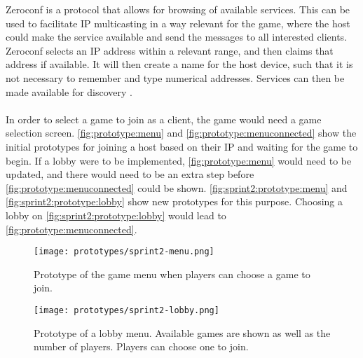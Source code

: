 Zeroconf is a protocol that allows for browsing of available services.
This can be used to facilitate IP multicasting in a way relevant for the game, where the host could make the service available and send the messages to all interested clients.
Zeroconf selects an IP address within a relevant range, and then claims that address if available.
It will then create a name for the host device, such that it is not necessary to remember and type numerical addresses.
Services can then be made available for discovery \cite{zeroconf}.
\\\\
In order to select a game to join as a client, the game would need a game selection screen.
\autoref{fig:prototype:menu} and \autoref{fig:prototype:menuconnected} show the initial prototypes for joining a host based on their IP and waiting for the game to begin.
If a lobby were to be implemented, \autoref{fig:prototype:menu} would need to be updated, and there would need to be an extra step before \autoref{fig:prototype:menuconnected} could be shown.
\autoref{fig:sprint2:prototype:menu} and \autoref{fig:sprint2:prototype:lobby} show new prototypes for this purpose.
Choosing a lobby on \autoref{fig:sprint2:prototype:lobby} would lead to \autoref{fig:prototype:menuconnected}.
\begin{figure}[H]
    \centering
    \texttt{[image: prototypes/sprint2-menu.png]}
    \caption{Prototype of the game menu when players can choose a game to join.}
    \label{fig:sprint2:prototype:menu}
\end{figure}

\begin{figure}[H]
    \centering
    \texttt{[image: prototypes/sprint2-lobby.png]}
    \caption{Prototype of a lobby menu. Available games are shown as well as the number of players. Players can choose one to join.}
    \label{fig:sprint2:prototype:lobby}
\end{figure}
